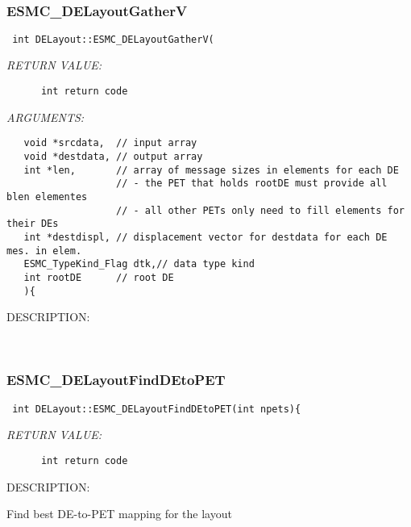    
 
\mbox{}\hrulefill\
 
\subsubsection [ESMC\_DELayoutGatherV] {ESMC\_DELayoutGatherV}


  
\begin{verbatim} int DELayout::ESMC_DELayoutGatherV(\end{verbatim}{\em RETURN VALUE:}
\begin{verbatim}      int return code\end{verbatim}{\em ARGUMENTS:}
\begin{verbatim}   void *srcdata,  // input array
   void *destdata, // output array
   int *len,       // array of message sizes in elements for each DE
                   // - the PET that holds rootDE must provide all blen elementes
                   // - all other PETs only need to fill elements for their DEs
   int *destdispl, // displacement vector for destdata for each DE mes. in elem.
   ESMC_TypeKind_Flag dtk,// data type kind
   int rootDE      // root DE
   ){\end{verbatim}
{\sf DESCRIPTION:\\ }


   
 
\mbox{}\hrulefill\
 
\subsubsection [ESMC\_DELayoutFindDEtoPET] {ESMC\_DELayoutFindDEtoPET}


  
\begin{verbatim} int DELayout::ESMC_DELayoutFindDEtoPET(int npets){\end{verbatim}{\em RETURN VALUE:}
\begin{verbatim}      int return code\end{verbatim}
{\sf DESCRIPTION:\\ }


      Find best DE-to-PET mapping for the layout
   
 
